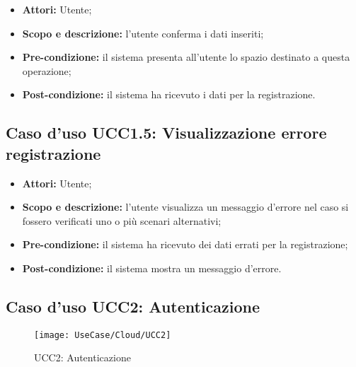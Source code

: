 \begin{itemize}
\item \textbf{Attori:} Utente;
\item \textbf{Scopo e descrizione:} l'utente conferma i dati inseriti;
\item \textbf{Pre-condizione:} il sistema presenta all'utente lo spazio destinato a questa operazione;
\item \textbf{Post-condizione:} il sistema ha ricevuto i dati per la registrazione.
\end{itemize}

\subsection{Caso d'uso UCC1.5: Visualizzazione errore registrazione}

\begin{itemize}
\item \textbf{Attori:} Utente;
\item \textbf{Scopo e descrizione:} l'utente visualizza un messaggio d'errore nel caso si fossero verificati uno o più scenari alternativi;
\item \textbf{Pre-condizione:} il sistema ha ricevuto dei dati errati per la registrazione;
\item \textbf{Post-condizione:} il sistema mostra un messaggio d'errore.
\end{itemize}

\subsection{Caso d'uso UCC2: Autenticazione}

\begin{figure}[H]
\centering
\texttt{[image: UseCase/Cloud/UCC2]}
\caption{UCC2: Autenticazione}
\end{figure}

